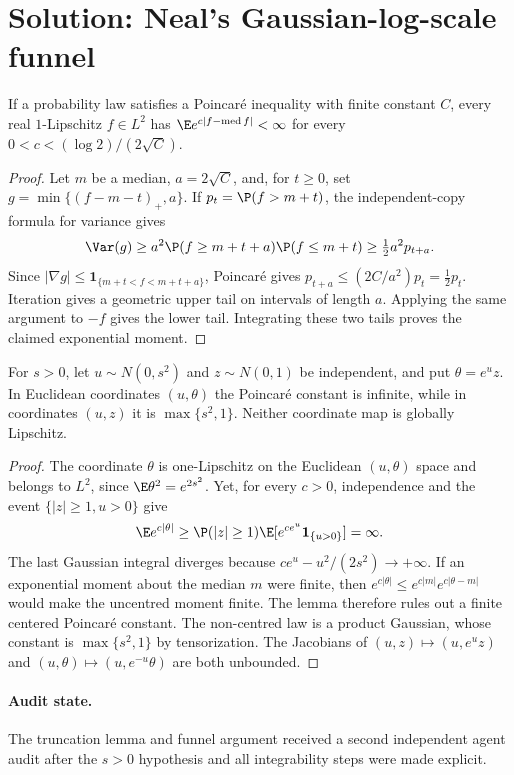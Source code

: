 \documentclass[../main.tex]{subfiles}
\begin{document}

\section*{Solution: Neal's Gaussian-log-scale funnel}

\begin{lemma}
If a probability law satisfies a Poincar\'e inequality with finite constant $C$, every real
$1$-Lipschitz $f\in L^2$ has
$\E e^{c|f-\operatorname{med}f|}<\infty$ for every
$0<c<(\log2)/(2\sqrt C)$.
\end{lemma}

\begin{proof}
Let $m$ be a median, $a=2\sqrt C$, and, for $t\ge0$, set
$g=\min\{(f-m-t)_+,a\}$. If $p_t=\P(f>m+t)$, the independent-copy formula for variance gives
\[
 \Var(g)\ge a^2\P(f\ge m+t+a)\P(f\le m+t)
 \ge\tfrac12a^2p_{t+a}.
\]
Since $|\nabla g|\le\mathbf1_{\{m+t<f<m+t+a\}}$, Poincar\'e gives
$p_{t+a}\le(2C/a^2)p_t=\tfrac12p_t$. Iteration gives a geometric upper tail on intervals of
length $a$. Applying the same argument to $-f$ gives the lower tail. Integrating these two tails
proves the claimed exponential moment.
\end{proof}

\begin{proposition}
For $s>0$, let $u\sim N(0,s^2)$ and $z\sim N(0,1)$ be independent, and put $\theta=e^uz$.
In Euclidean
coordinates $(u,\theta)$ the Poincar\'e constant is infinite, while in coordinates $(u,z)$ it is
$\max\{s^2,1\}$. Neither coordinate map is globally Lipschitz.
\end{proposition}

\begin{proof}
The coordinate $\theta$ is one-Lipschitz on the Euclidean $(u,\theta)$ space and belongs to
$L^2$, since $\E\theta^2=e^{2s^2}$. Yet, for every $c>0$, independence and the event
$\{|z|\ge1,u>0\}$ give
\[
\E e^{c|\theta|}\ge\P(|z|\ge1)\E[e^{ce^u}\mathbf1_{\{u>0\}}]=\infty.
\]
The last Gaussian integral diverges because
$ce^u-u^2/(2s^2)\to+\infty$. If an exponential moment about the median $m$ were finite, then
$e^{c|\theta|}\le e^{c|m|}e^{c|\theta-m|}$ would make the uncentred moment finite. The lemma
therefore rules out a finite centered Poincar\'e constant. The non-centred law is a
product Gaussian, whose constant is $\max\{s^2,1\}$ by tensorization. The Jacobians of
$(u,z)\mapsto(u,e^uz)$ and $(u,\theta)\mapsto(u,e^{-u}\theta)$ are both unbounded.
\end{proof}

\paragraph{Audit state.}
The truncation lemma and funnel argument received a second independent agent audit after the
$s>0$ hypothesis and all integrability steps were made explicit.
\end{document}
